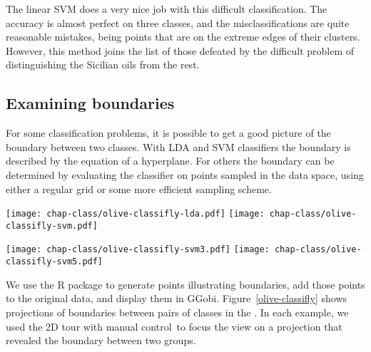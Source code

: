 The linear SVM does a very nice job with this difficult
classification. The accuracy is almost perfect on three classes,
and the misclassifications are quite reasonable mistakes, being points
that are on the extreme edges of their clusters.  However, this method
joins the list of those defeated by the difficult problem of
distinguishing the Sicilian oils from the rest.

\subsection{Examining boundaries}


For some classification problems, it is possible to get a good picture
of the boundary between two classes. With LDA and SVM classifiers the
boundary is described by the equation of a hyperplane. For others the
boundary can be determined by evaluating the classifier on points
sampled in the data space, using either a regular grid or some more
efficient sampling scheme.

\begin{figure*}[htbp]
\centerline{{\texttt{[image: chap-class/olive-classifly-lda.pdf]}}
 {\texttt{[image: chap-class/olive-classifly-svm.pdf]}}}
\smallskip
\centerline{{\texttt{[image: chap-class/olive-classifly-svm3.pdf]}}
 {\texttt{[image: chap-class/olive-classifly-svm5.pdf]}}}
\caption[Classification boundaries for different
models]{Classification boundaries for different models shown in the 2D
tour. Points on the boundary are gray stars.  We first compare LDA
{\bf (top left)} with linear SVM {\bf (top right)} in finding the
boundary between oils from the North and Sardinia.  Both boundaries
are too close to the cluster of Northern oils.  We also compare linear
SVM {\bf (bottom left)} and radial kernel SVM {\bf (bottom right)} in
finding the boundary between oils from South Apulia and other Southern
oils.  }
\label{olive-classifly} 
\end{figure*}

 
 We use the R package 
\cite{Wi06} to generate points illustrating boundaries, add those
points to the original data, and display them in GGobi.
Figure~\ref{olive-classifly} shows projections of boundaries between
pairs of classes in the .  In each example, we used
the 2D tour with manual control~to focus the view on a projection that
revealed the boundary between two groups.

